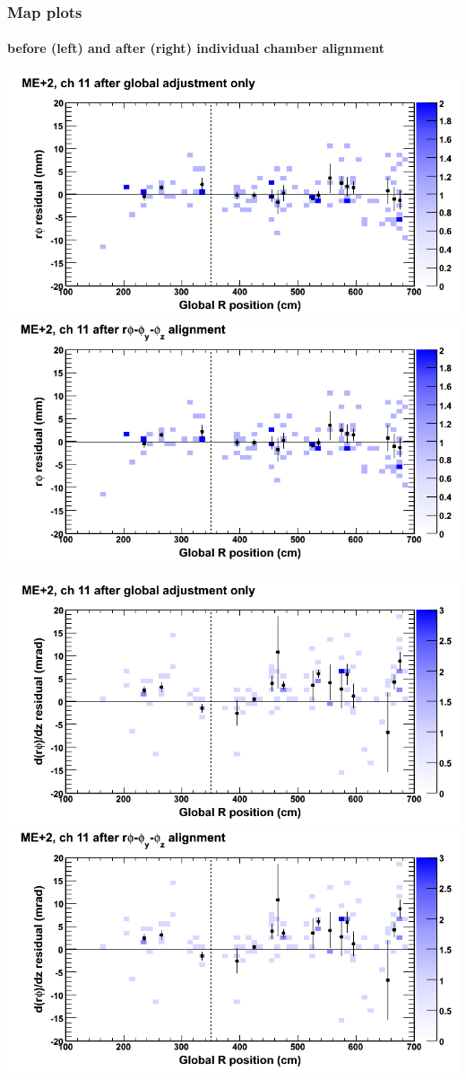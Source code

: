 \documentclass[compress]{beamer}
\begin{document}
\begin{frame}
\frametitle{Map plots}
\framesubtitle{before (left) and after (right) individual chamber alignment}
\includegraphics[width=0.5\linewidth]{ringmapplots_3dof/before_CSCvsr_mep2ch11_x.png} \includegraphics[width=0.5\linewidth]{ringmapplots_3dof/after_CSCvsr_mep2ch11_x.png}

\includegraphics[width=0.5\linewidth]{ringmapplots_3dof/before_CSCvsr_mep2ch11_dxdz.png} \includegraphics[width=0.5\linewidth]{ringmapplots_3dof/after_CSCvsr_mep2ch11_dxdz.png}
\end{frame}
\end{document}
